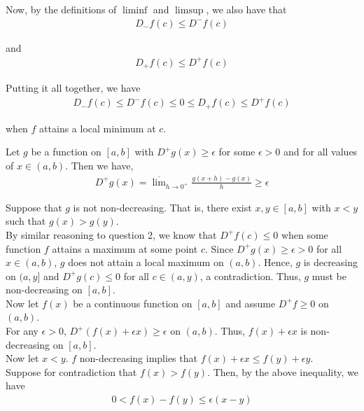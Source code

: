 \documentclass[12pt]{article}
\newenvironment{problem}[2][Problem]{\begin{trivlist}
\item[\hskip \labelsep {\bfseries #1}\hskip \labelsep {\bfseries #2.}]}{\end{trivlist}}
\begin{document}
Now, by the definitions of $\liminf$ and $\limsup$, we also have that
\begin{align*}
D_-f(c) \leq D^-f(c)
\end{align*}

and
\begin{align*}
D_+f(c) \leq D^+f(c)
\end{align*}

Putting it all together, we have
\begin{align*}
D_-f(c) \leq D^-f(c) \leq 0 \leq D_+f(c) \leq D^+f(c)
\end{align*}

when $f$ attains a local minimum at $c$.
\newpage
\begin{problem}{3}
\end{problem}

Let $g$ be a function on $[a, b]$ with $D^+g(x) \geq \epsilon$ for some $\epsilon > 0$ and for all values of $x \in (a, b)$. Then we have,
\begin{align*}
D^+g(x) = \overline{\lim}_{h \to 0^+} \frac{g(x+h) - g(x)}{h} \geq \epsilon
\end{align*}

Suppose that $g$ is not non-decreasing. That is, there exist $x, y \in [a, b]$ with $x < y$ such that $g(x) > g(y)$.\\

By similar reasoning to question 2, we know that $D^+f(c) \leq 0$ when some function $f$ attains a maximum at some point $c$. Since $D^+g(x) \geq \epsilon > 0$ for all $x \in (a, b)$, $g$ does not attain a local maximum on $(a, b)$. Hence, $g$ is decreasing on $(a, y]$ and $D^+g(c) \leq 0$ for all $c \in (a, y)$, a contradiction. Thus, $g$ must be non-decreasing on $[a, b]$.\\

Now let $f(x)$ be a continuous function on $[a, b]$ and assume $D^+f \geq 0$ on $(a, b)$.\\

For any $\epsilon > 0$, $D^+(f(x) + \epsilon x) \geq \epsilon$ on $(a, b)$. Thus, $f(x) + \epsilon x$ is non-decreasing on $[a, b]$.\\

Now let $x < y$. $f$ non-decreasing implies that $f(x) + \epsilon x \leq f(y) + \epsilon y$.\\

Suppose for contradiction that $f(x) > f(y)$. Then, by the above inequality, we have
\begin{align*}
0 < f(x) - f(y) \leq \epsilon(x - y)
\end{align*}
\end{document}
